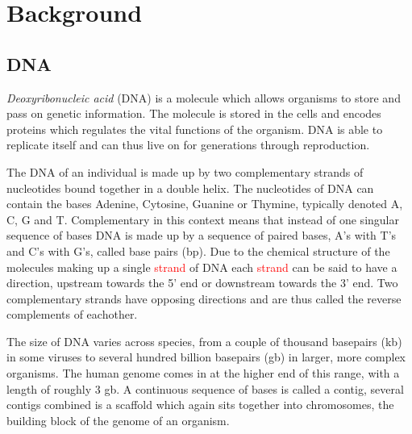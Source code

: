 \documentclass[thesis.tex]{subfiles}
\begin{document}
\chapter{Background}
\section{DNA}
\textit{Deoxyribonucleic acid} (DNA) is a molecule which allows organisms to store and pass on genetic information. The molecule is stored in the cells and encodes proteins which regulates the vital functions of the organism. DNA is able to replicate itself and can thus live on for generations through reproduction.\\
\par\noindent
The DNA of an individual is made up by two complementary strands of nucleotides bound together in a double helix. The nucleotides of DNA can contain the bases Adenine, Cytosine, Guanine or Thymine, typically denoted A, C, G and T. Complementary in this context means that instead of one singular sequence of bases DNA is made up by a sequence of paired bases, A's with T's and C's with G's, called base pairs (bp). Due to the chemical structure of the molecules making up a single \textcolor{red}{strand} of DNA each \textcolor{red}{strand} can be said to have a direction, upstream towards the 5' end or downstream towards the 3' end. Two complementary strands have opposing directions and are thus called the reverse complements of eachother.\\
\par\noindent
The size of DNA varies across species, from a couple of thousand basepairs (kb) in some viruses to several hundred billion basepairs (gb) in larger, more complex organisms. The human genome comes in at the higher end of this range, with a length of roughly 3 gb. A continuous sequence of bases is called a contig, several contigs combined is a scaffold which again sits together into chromosomes, the building block of the genome of an organism.\\
\end{document}
